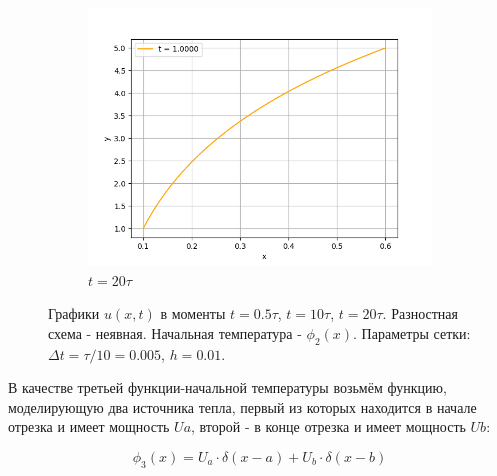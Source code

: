 \documentclass[12pt]{article}%
\begin{document}
\begin{figure}[H]
\begin{subfigure}{0.32\textwidth}
    \includegraphics[width=\textwidth]{implicit-phi2-time-1.0000.png}
    \caption{$t = 20 \tau$}
\end{subfigure}
\caption{Графики $u(x, t)$ в моменты $t = 0.5 \tau$, $t = 10 \tau$, $t = 20 \tau$. Разностная схема - неявная. Начальная температура - $\phi_2(x)$. Параметры сетки: $\Delta t = \tau / 10 = 0.005$, $h=0.01$.}
\end{figure}

В качестве третьей функции-начальной температуры возьмём функцию, моделирующую два источника тепла, первый из которых находится в начале отрезка и имеет мощность $Ua$, второй - в конце отрезка и имеет мощность $Ub$:

\begin{equation*}
\phi_3(x) = U_a \cdot \delta (x - a) + U_b \cdot \delta (x - b)
\end{equation*}
\end{document}
